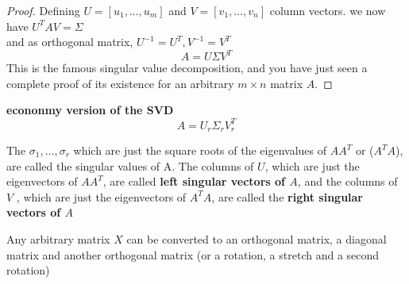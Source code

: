 \documentclass{book}
\begin{document}
\begin{proof}
Defining $U = [u_1, \ldots, u_m]$ and $V = [v_1, \ldots, v_n]$ column vectors.
we now have $U^TAV = \Sigma$\\
and as orthogonal matrix, $U^{-1} = U^T, V^{-1} = V^T$
$$ A = U \Sigma V^T $$
This is the famous singular value decomposition, and you have just seen a complete proof of its existence for an arbitrary $m \times n$ matrix $A$.
\end{proof}

\begin{remark}
\textbf{econonmy version of the SVD}\\
$$ A = U_r \Sigma_r V_r^T $$
\end{remark}

\begin{remark}
The $\sigma_1, \ldots, \sigma_r$ which are just the square roots of the eigenvalues of $A A^T$ or ($A^T A$), are called the singular values of A.
The columns of $U$, which are just the eigenvectors of $A A^T$, are called \textbf{left singular vectors of $A$},
and the columns of $V$ , which are just the eigenvectors of $A^T A$, are called the \textbf{right singular vectors of $A$}
\end{remark}

Any arbitrary matrix $X$ can be converted to an orthogonal matrix, a diagonal matrix and another orthogonal matrix
(or a rotation, a stretch and a second rotation)
\end{document}
